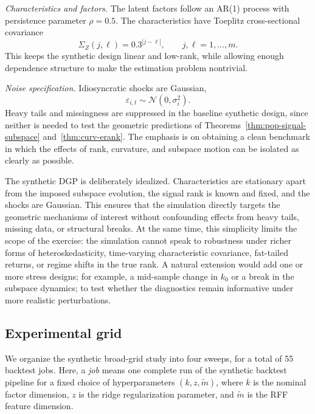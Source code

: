 \documentclass[11pt,letterpaper]{article}
\begin{document}
\textit{Characteristics and factors.} The latent factors follow an AR(1) process with persistence parameter $\rho=0.5$. The characteristics have Toeplitz cross-sectional covariance
\begin{equation*}
\Sigma_Z(j,\ell)=0.3^{|j-\ell|},
\qquad j,\ell=1,\dots,m.
\end{equation*}
This keeps the synthetic design linear and low-rank, while allowing enough dependence structure to make the estimation problem nontrivial.

\textit{Noise specification.} Idiosyncratic shocks are Gaussian,
\begin{equation*}
\varepsilon_{i,t}\sim \mathcal N(0,\sigma_i^2).
\end{equation*}
Heavy tails and missingness are suppressed in the baseline synthetic design, since neither is needed to test the geometric predictions of Theorems~\ref{thm:pop-signal-subspace} and~\ref{thm:curv-erank}. The emphasis is on obtaining a clean benchmark in which the effects of rank, curvature, and subspace motion can be isolated as clearly as possible.

The synthetic DGP is deliberately idealized. Characteristics are stationary apart from the imposed subspace evolution, the signal rank is known and fixed, and the shocks are Gaussian. This ensures that the simulation directly targets the geometric mechanisms of interest without confounding effects from heavy tails, missing data, or structural breaks. At the same time, this simplicity limits the scope of the exercise: the simulation cannot speak to robustness under richer forms of heteroskedasticity, time-varying characteristic covariance, fat-tailed returns, or regime shifts in the true rank. A natural extension would add one or more stress designs; for example, a mid-sample change in $k_0$ or a break in the subspace dynamics; to test whether the diagnostics remain informative under more realistic perturbations.

\subsection{Experimental grid}
\label{sec:sim:grid}

We organize the synthetic broad-grid study into four sweeps, for a total of 55 backtest jobs. Here, a \emph{job} means one complete run of the synthetic backtest pipeline for a fixed choice of hyperparameters $(k,z,\tilde m)$, where $k$ is the nominal factor dimension, $z$ is the ridge regularization parameter, and $\tilde m$ is the RFF feature dimension.
\end{document}

